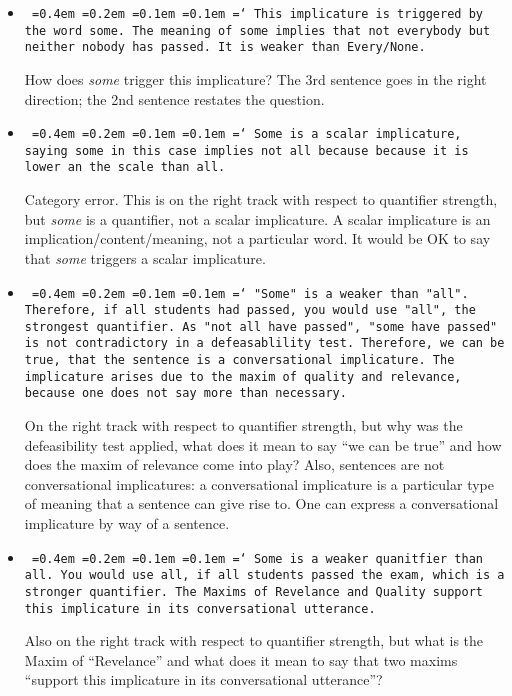 \documentclass[a4,11pt]{article}
\newcommand*\justify{%
  \fontdimen2\font=0.4em%
  \fontdimen3\font=0.2em%
  \fontdimen4\font=0.1em%
  \fontdimen7\font=0.1em%
  \hyphenchar\font=`\-%
}
\begin{document}
\begin{itemize}[leftmargin = 12pt]

\item \texttt{\justify This implicature is triggered by the word some. The meaning of some implies that not everybody but neither nobody has passed. It is weaker than Every/None.}

How does {\em some} trigger this implicature? The 3rd sentence goes in the right direction; the 2nd sentence restates the question.

\item \texttt{\justify Some is a scalar implicature, saying some in this case implies not all because because it is lower an the scale than all.}

Category error. This is on the right track with respect to quantifier strength, but {\em some} is a quantifier, not a scalar implicature. A scalar implicature is an implication/content/meaning, not a particular word. It would be OK to say that {\em some} triggers a scalar implicature.

\item \texttt{\justify "Some" is a weaker than "all". Therefore, if all students had passed, you would use "all", the strongest quantifier. As "not all have passed", "some have passed" is not contradictory in a defeasablility test. Therefore, we can be true, that the sentence is a conversational implicature. The implicature arises due to the maxim of quality and relevance, because one does not say more than necessary.}

On the right track with respect to quantifier strength, but why was the defeasibility test applied, what does it mean to say ``we can be true'' and how does the maxim of relevance come into play? Also, sentences are not conversational implicatures: a conversational implicature is a particular type of meaning that a sentence can give rise to. One can express a conversational implicature by way of a sentence.

\item \texttt{\justify Some is a weaker quanitfier than all. You would use all,  if all students passed the exam, which is a stronger quantifier. The Maxims of Revelance and Quality support this implicature in its conversational utterance.}

Also on the right track with respect to quantifier strength, but what is the Maxim of ``Revelance'' and what does it mean to say that two maxims ``support this implicature in its conversational utterance''?


\end{itemize}
\end{document}
